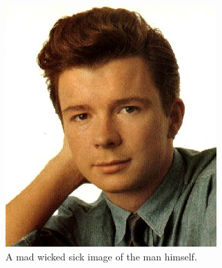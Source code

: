 \documentclass[11pt]{report}
\begin{document}
\begin{figure}[hc]
  \includegraphics[totalheight=15cm]{lol}
  \caption{A mad wicked sick image of the man himself.}
\end{figure}
\end{document}
